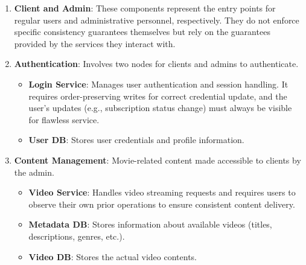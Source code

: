 \begin{enumerate}[leftmargin=*,noitemsep,topsep=2pt]
  \item \textbf{Client and Admin}: These components represent the
    entry points for regular users and administrative personnel,
    respectively. They do not enforce specific consistency guarantees
    themselves but rely on the guarantees provided by the services
    they interact with.

  \item \textbf{Authentication}: Involves two nodes for clients and admins to authenticate.
    \begin{itemize}[leftmargin=*, noitemsep,topsep=0pt]
      \item \textbf{Login Service}: Manages user authentication and
        session handling. It requires order-preserving writes
        for correct credential update, and the user's updates
        (e.g., subscription status change) must always be visible for
        flawless service.
      \item \textbf{User DB}: Stores user credentials and
        profile information.
    \end{itemize}

  \item \textbf{Content Management}: Movie-related content made accessible to clients by the admin.
    \begin{itemize}[leftmargin=*, noitemsep,topsep=0pt]
      \item \textbf{Video Service}: Handles video streaming requests
        and requires users to observe their own prior operations to ensure
        consistent content delivery.
      \item \textbf{Metadata DB}: Stores information about
        available videos (titles, descriptions, genres, etc.).
      \item \textbf{Video DB}: Stores the actual video contents.
    \end{itemize}


\end{enumerate}
